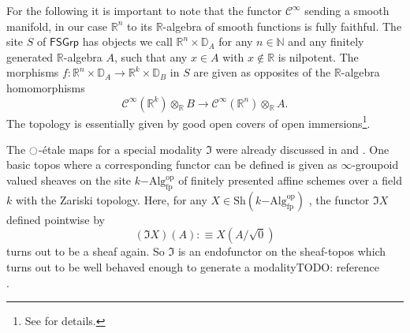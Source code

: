 \documentclass[9pt,twosided]{amsart}
\newcommand{\bD}{\mathbb D}
\newcommand{\bN}{\mathbb N}
\newcommand{\bR}{\mathbb R}
\newcommand{\FSGrp}{\ensuremath{\mathsf{FSGrp}}}
\newcommand{\todo}[1]{{\color{red}TODO: #1 \\}}
\begin{document}
For the following it is important to note that the functor $\mathcal C^\infty$ sending a smooth manifold, in our case $\bR^n$ to its $\bR$-algebra of smooth functions is fully faithful.
The site $S$ of $\FSGrp$ has objects we call $\bR^n\times\bD_A$ for any $n\in\bN$ and any finitely generated $\bR$-algebra $A$,
such that any $x\in A$ with $x\notin\bR$ is nilpotent.
The morphisms $f:\bR^n\times\bD_A\to \bR^k\times\bD_B$ in $S$ are given as opposites of the $\bR$-algebra homomorphisms
\[ \mathcal C^\infty(\bR^k)\otimes_\bR B \to \mathcal C^\infty(\bR^n)\otimes_\bR A\text{.} \]
The topology is essentially given by good open covers of open immersions\footnote{See \cite[Definition 2.11]{SyntheticPDEs} for details.}.

The ${\ocircle}$-étale maps for a special modality $\Im$ were already discussed in \cite{wellen-thesis} and \cite{wellen-cartan-geometry}.
One basic topos where a corresponding functor can be defined is given as $\infty$-groupoid valued sheaves on the site $k\mathrm{-Alg}^{\mathrm{op}}_{\mathrm{fp}}$ of finitely presented affine schemes over a field $k$ with the Zariski topology. Here, for any $X\in\mathrm{Sh}(k\mathrm{-Alg}^\mathrm{op}_{\mathrm{fp}})$ ,
the functor $\Im X$ defined pointwise by
\[ (\Im X)(A):\equiv X(A/\sqrt{0})\]
turns out to be a sheaf again. So $\Im$ is an endofunctor on the sheaf-topos which turns out to be well behaved enough to generate a modality\todo{reference}.
\end{document}
